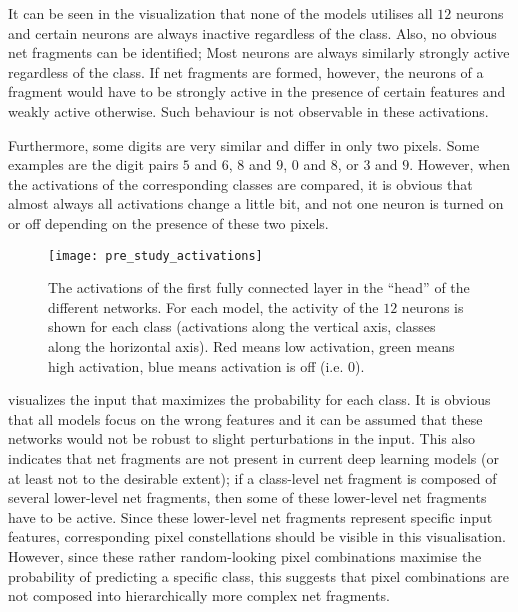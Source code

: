 It can be seen in the visualization that none of the models utilises all $12$ neurons and certain neurons are always inactive regardless of the class.
Also, no obvious net fragments can be identified;
Most neurons are always similarly strongly active regardless of the class.
If net fragments are formed, however, the neurons of a fragment would have to be strongly active in the presence of certain features and weakly active otherwise.
Such behaviour is not observable in these activations.

Furthermore, some digits are very similar and differ in only two pixels.
Some examples are the digit pairs $5$ and $6$, $8$ and $9$, $0$ and $8$, or $3$ and $9$.
However, when the activations of the corresponding classes are compared, it is obvious that almost always all activations change a little bit, and not one neuron is turned on or off depending on the presence of these two pixels.

\begin{figure}[h]
    \centering
    \texttt{[image: pre\_study\_activations]}
    \caption[Network activations of classification networks on the straight line dataset]{The activations of the first fully connected layer in the ``head'' of the different networks. For each model, the activity of the $12$ neurons is shown for each class (activations along the vertical axis, classes along the horizontal axis). Red means low activation, green means high activation, blue means activation is off (i.e. $0$).}
\end{figure}


 visualizes the input that maximizes the probability for each class.
It is obvious that all models focus on the wrong features and it can be assumed that these networks would not be robust to slight perturbations in the input.
This also indicates that net fragments are not present in current deep learning models (or at least not to the desirable extent);
if a class-level net fragment is composed of several lower-level net fragments, then some of these lower-level net fragments have to be active.
Since these lower-level net fragments represent specific input features, corresponding pixel constellations should be visible in this visualisation.
However, since these rather random-looking pixel combinations maximise the probability of predicting a specific class, this suggests that pixel combinations are not composed into hierarchically more complex net fragments.

